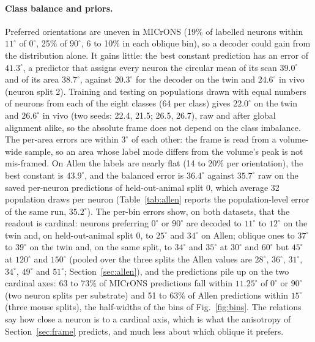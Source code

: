 \documentclass[11pt]{article}
\begin{document}
\paragraph{Class balance and priors.} Preferred orientations are uneven in MICrONS (19\% of labelled neurons within $11^\circ$ of $0^\circ$, 25\% of $90^\circ$, 6 to 10\% in each oblique bin), so a decoder could gain from the distribution alone. It gains little: the best constant prediction has an error of $41.3^\circ$, a predictor that assigns every neuron the circular mean of its scan $39.0^\circ$ and of its area $38.7^\circ$, against $20.3^\circ$ for the decoder on the twin and $24.6^\circ$ in vivo (neuron split 2). Training and testing on populations drawn with equal numbers of neurons from each of the eight classes (64 per class) gives $22.0^\circ$ on the twin and $26.6^\circ$ in vivo (two seeds: 22.4, 21.5; 26.5, 26.7), raw and after global alignment alike, so the absolute frame does not depend on the class imbalance. The per-area errors are within $3^\circ$ of each other: the frame is read from a volume-wide sample, so an area whose label mode differs from the volume's peak is not mis-framed. On Allen the labels are nearly flat (14 to 20\% per orientation), the best constant is $43.9^\circ$, and the balanced error is $36.4^\circ$ against $35.7^\circ$ raw on the saved per-neuron predictions of held-out-animal split 0, which average 32 population draws per neuron (Table~\ref{tab:allen} reports the population-level error of the same run, $35.2^\circ$). The per-bin errors show, on both datasets, that the readout is cardinal: neurons preferring $0^\circ$ or $90^\circ$ are decoded to $11^\circ$ to $12^\circ$ on the twin and, on held-out-animal split 0, to $25^\circ$ and $34^\circ$ on Allen; oblique ones to $37^\circ$ to $39^\circ$ on the twin and, on the same split, to $34^\circ$ and $35^\circ$ at $30^\circ$ and $60^\circ$ but $45^\circ$ at $120^\circ$ and $150^\circ$ (pooled over the three splits the Allen values are $28^\circ$, $36^\circ$, $31^\circ$, $34^\circ$, $49^\circ$ and $51^\circ$; Section~\ref{sec:allen}), and the predictions pile up on the two cardinal axes: 63 to 73\% of MICrONS predictions fall within $11.25^\circ$ of $0^\circ$ or $90^\circ$ (two neuron splits per substrate) and 51 to 63\% of Allen predictions within $15^\circ$ (three mouse splits), the half-widths of the bins of Fig.~\ref{fig:bins}. The relations say how close a neuron is to a cardinal axis, which is what the anisotropy of Section~\ref{sec:frame} predicts, and much less about which oblique it prefers.
\end{document}
